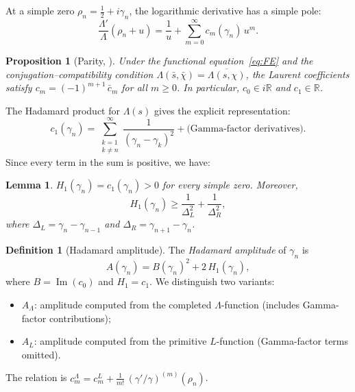 \documentclass[11pt,a4paper]{article}
\theoremstyle{plain}
\newtheorem{proposition}[theorem]{Proposition}
\newtheorem{lemma}[theorem]{Lemma}
\theoremstyle{definition}
\newtheorem{definition}[theorem]{Definition}
\newcommand{\La}{\Lambda}
\begin{document}
At a simple zero $\rho_n = \tfrac{1}{2} + i\gamma_n$, the
logarithmic derivative has a simple pole:
\[
  \frac{\La'}{\La}(\rho_n + u) = \frac{1}{u}
  + \sum_{m=0}^{\infty} c_m(\gamma_n)\, u^m.
\]

\begin{proposition}[Parity, {\cite[Theorem~5]{paper2}}]\label{prop:parity}
Under the functional equation~\eqref{eq:FE} and the
conjugation--compatibility condition
$\La(\bar{s}, \bar{\chi}) = \overline{\La(s,\chi)}$,
the Laurent coefficients satisfy
$c_m = (-1)^{m+1}\,\bar{c}_m$ for all $m \ge 0$.
In particular, $c_0 \in i\mathbb{R}$ and $c_1 \in \mathbb{R}$.
\end{proposition}

The Hadamard product for $\La(s)$ gives the explicit representation:
\begin{equation}\label{eq:hadamard_c1}
  c_1(\gamma_n) = \sum_{\substack{k=1 \\ k \ne n}}^{\infty}
  \frac{1}{(\gamma_n - \gamma_k)^2}
  + \text{(Gamma-factor derivatives)}.
\end{equation}
Since every term in the sum is positive, we have:

\begin{lemma}\label{lem:H1_positive}
$H_1(\gamma_n) = c_1(\gamma_n) > 0$ for every simple zero.
Moreover,
\begin{equation}\label{eq:H1_NN}
  H_1(\gamma_n) \ge \frac{1}{\Delta_L^2} + \frac{1}{\Delta_R^2},
\end{equation}
where $\Delta_L = \gamma_n - \gamma_{n-1}$ and
$\Delta_R = \gamma_{n+1} - \gamma_n$.
\end{lemma}

\begin{definition}[Hadamard amplitude]\label{def:amplitude}
The \emph{Hadamard amplitude} of $\gamma_n$ is
\[
  A(\gamma_n) = B(\gamma_n)^2 + 2\,H_1(\gamma_n),
\]
where $B = \operatorname{Im}(c_0)$ and $H_1 = c_1$.
We distinguish two variants:
\begin{itemize}
  \item $A_\La$: amplitude computed from the completed
        $\La$-function (includes Gamma-factor contributions);
  \item $A_L$: amplitude computed from the primitive
        $L$-function (Gamma-factor terms omitted).
\end{itemize}
The relation is
$c_m^\La = c_m^L + \frac{1}{m!}\,(\gamma'/\gamma)^{(m)}(\rho_n)$.
\end{definition}
\end{document}
